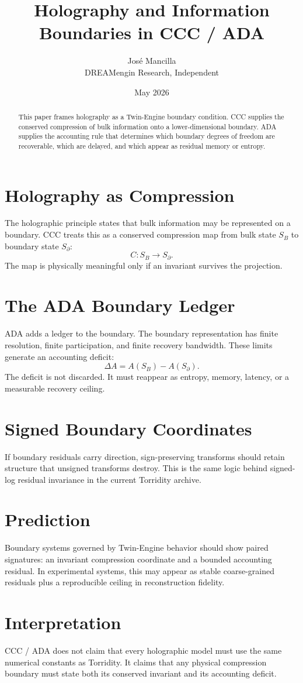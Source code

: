 \documentclass[11pt]{article}
\title{Holography and Information Boundaries in CCC / ADA}
\author{José Mancilla\\DREAMengin Research, Independent}
\date{May 2026}
\begin{document}
\maketitle

\begin{abstract}
This paper frames holography as a Twin-Engine boundary condition. CCC supplies the conserved compression of bulk information onto a lower-dimensional boundary. ADA supplies the accounting rule that determines which boundary degrees of freedom are recoverable, which are delayed, and which appear as residual memory or entropy.
\end{abstract}

\section{Holography as Compression}
The holographic principle states that bulk information may be represented on a boundary. CCC treats this as a conserved compression map from bulk state $S_B$ to boundary state $S_\partial$:
\begin{equation}
C: S_B \rightarrow S_\partial.
\end{equation}
The map is physically meaningful only if an invariant survives the projection.

\section{The ADA Boundary Ledger}
ADA adds a ledger to the boundary. The boundary representation has finite resolution, finite participation, and finite recovery bandwidth. These limits generate an accounting deficit:
\begin{equation}
\Delta A = A(S_B) - A(S_\partial).
\end{equation}
The deficit is not discarded. It must reappear as entropy, memory, latency, or a measurable recovery ceiling.

\section{Signed Boundary Coordinates}
If boundary residuals carry direction, sign-preserving transforms should retain structure that unsigned transforms destroy. This is the same logic behind signed-log residual invariance in the current Torridity archive.

\section{Prediction}
Boundary systems governed by Twin-Engine behavior should show paired signatures: an invariant compression coordinate and a bounded accounting residual. In experimental systems, this may appear as stable coarse-grained residuals plus a reproducible ceiling in reconstruction fidelity.

\section{Interpretation}
CCC / ADA does not claim that every holographic model must use the same numerical constants as Torridity. It claims that any physical compression boundary must state both its conserved invariant and its accounting deficit.
\end{document}
